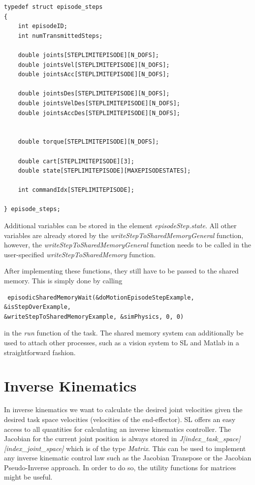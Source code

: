 \documentclass[11pt, article, colorback]{article}
\begin{document}
\begin{lstlisting}
typedef struct episode_steps
{
	int episodeID;
	int numTransmittedSteps;
	
	double joints[STEPLIMITEPISODE][N_DOFS];
	double jointsVel[STEPLIMITEPISODE][N_DOFS];
	double jointsAcc[STEPLIMITEPISODE][N_DOFS];

	double jointsDes[STEPLIMITEPISODE][N_DOFS];
	double jointsVelDes[STEPLIMITEPISODE][N_DOFS];
	double jointsAccDes[STEPLIMITEPISODE][N_DOFS];

	
	double torque[STEPLIMITEPISODE][N_DOFS];

	double cart[STEPLIMITEPISODE][3];
	double state[STEPLIMITEPISODE][MAXEPISODESTATES];
	
	int commandIdx[STEPLIMITEPISODE];
	
} episode_steps;
\end{lstlisting}
Additional variables can be stored in the element {\em episodeStep.state}. All other variables are 
already stored by the {\em writeStepToSharedMemoryGeneral} function, however, the  {\em writeStepToSharedMemoryGeneral} function
needs to be called in the user-specified {\em writeStepToSharedMemory} function.

After implementing these functions, they still have to be passed to the shared memory. This is simply done by calling
\begin{lstlisting}
 episodicSharedMemoryWait(&doMotionEpisodeStepExample, &isStepOverExample, 
&writeStepToSharedMemoryExample, &simPhysics, 0, 0)
\end{lstlisting}

in the {\em run} function of the task. The shared memory system can additionally be used to attach 
other processes, such as a vision system to SL and Matlab in a straightforward 
fashion.



\section{Inverse Kinematics}
In inverse kinematics we want to calculate the desired joint velocities given the desired task space velocities (velocities of the end-effector). 
SL offers an easy access to all quantities for calculating an inverse kinematics controller. The Jacobian for the current joint position is always stored in
{\em J[index\_task\_space][index\_joint\_space]} which is of the type {\em Matrix}. This can be used to implement any inverse kinematic control law such as the Jacobian Transpose 
or the Jacobian Pseudo-Inverse approach. In order to do so, the utility functions for matrices might be useful. 
\end{document}
